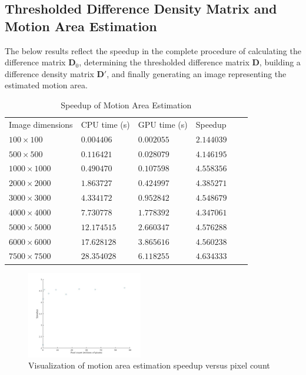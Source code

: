 \documentclass[journal]{IEEEtran}
\begin{document}
\subsection{Thresholded Difference Density Matrix and Motion Area Estimation}
The below results reflect the speedup in the complete procedure of calculating the difference matrix $\boldsymbol{D}_0$, determining the thresholded difference matrix $\boldsymbol{D}$, building a difference density matrix $\boldsymbol{D}'$, and finally generating an image representing the estimated motion area.
\begin{table}[H]
	\small
	\centering
	\caption{Speedup of Motion Area Estimation}
	\label{motion-area-speedup}
	\begin{tabular}{llllll}
	 Image dimensions & CPU time (s) & GPU time (s) & Speedup \\
	 $100 \times 100$ & $0.004406$ & $0.002055$ & $2.144039$ \\
	 $500 \times 500$ & $0.116421$ & $0.028079$ & $4.146195$ \\
	 $1000 \times 1000$ & $0.490470$ & $0.107598$ & $4.558356$ \\
	 $2000 \times 2000$ & $1.863727$ & $0.424997$ & $4.385271$ \\
	 $3000 \times 3000$ & $4.334172$ & $0.952842$ & $4.548679$ \\
	 $4000 \times 4000$ & $7.730778$ & $1.778392$ & $4.347061$ \\
	 $5000 \times 5000$ & $12.174515$ & $2.660347$ & $4.576288$ \\
	 $6000 \times 6000$ & $17.628128$ & $3.865616$ & $4.560238$ \\
	 $7500 \times 7500$ & $28.354028$ & $6.118255$ & $4.634333$ \\
	\end{tabular}
\end{table}
\begin{figure}[h]
	\centering
	\includegraphics[width=0.45\textwidth]{motion_area_estimation_speedup_graph.jpg}
	\caption{Visualization of motion area estimation speedup versus pixel count}
    \label{motion-area-estimation-speedup-graph}
\end{figure}
\end{document}
